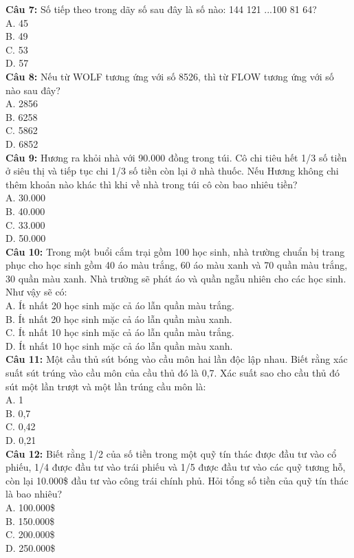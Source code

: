 \begin{multicols}{2}
\textbf{Câu 7:} Số tiếp theo trong dãy số sau đây là số nào: 144 121 ...100 81 64? \\
A. 45 \\
B. 49 \\
C. 53 \\
D. 57 \\

\textbf{Câu 8:} Nếu từ WOLF tương ứng với số 8526, thì từ FLOW tương ứng với số nào sau đây? \\
A. 2856 \\
B. 6258 \\
C. 5862 \\
D. 6852 \\

\textbf{Câu 9:} Hương ra khỏi nhà với 90.000 đồng trong túi. Cô chi tiêu hết 1/3 số tiền ở siêu thị và tiếp tục chi 1/3 số tiền còn lại ở nhà thuốc. Nếu Hương không chi thêm khoản nào khác thì khi về nhà trong túi cô còn bao nhiêu tiền? \\
A. 30.000 \\
B. 40.000 \\
C. 33.000 \\
D. 50.000 \\

\textbf{Câu 10:} Trong một buổi cắm trại gồm 100 học sinh, nhà trường chuẩn bị trang phục cho học sinh gồm 40 áo màu trắng, 60 áo màu xanh và 70 quần màu trắng, 30 quần màu xanh. Nhà trường sẽ phát áo và quần ngẫu nhiên cho các học sinh. Như vậy sẽ có: \\
A. Ít nhất 20 học sinh mặc cả áo lẫn quần màu trắng. \\
B. Ít nhất 20 học sinh mặc cả áo lẫn quần màu xanh. \\
C. Ít nhất 10 học sinh mặc cả áo lẫn quần màu trắng. \\
D. Ít nhất 10 học sinh mặc cả áo lẫn quần màu xanh. \\

\textbf{Câu 11:} Một cầu thủ sút bóng vào cầu môn hai lần độc lập nhau. Biết rằng xác suất sút trúng vào cầu môn của cầu thủ đó là 0,7. Xác suất sao cho cầu thủ đó sút một lần trượt và một lần trúng cầu môn là: \\
A. 1 \\
B. 0,7 \\
C. 0,42 \\
D. 0,21 \\

\textbf{Câu 12:} Biết rằng 1/2 của số tiền trong một quỹ tín thác được đầu tư vào cổ phiếu, 1/4 được đầu tư vào trái phiếu và 1/5 được đầu tư vào các quỹ tương hỗ, còn lại 10.000\$ đầu tư vào công trái chính phủ. Hỏi tổng số tiền của quỹ tín thác là bao nhiêu? \\
A. 100.000\$ \\
B. 150.000\$ \\
C. 200.000\$ \\
D. 250.000\$ \\


\end{multicols}
